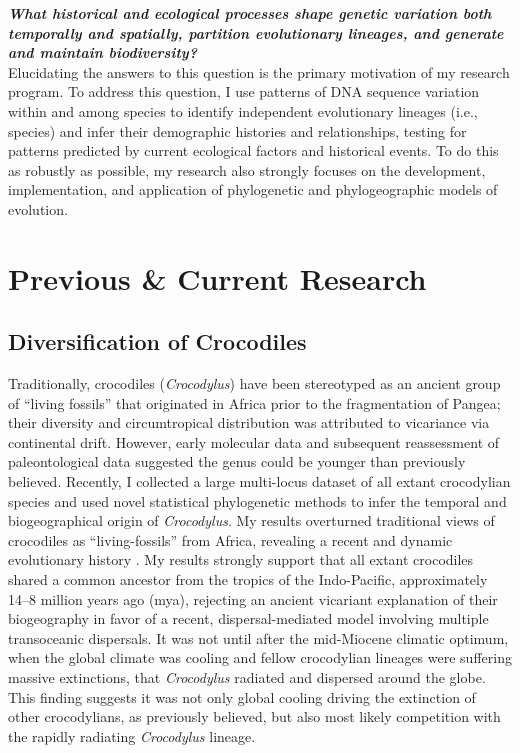 \documentclass[10pt]{article}
\begin{document}
\raggedright
\singlespacing

\textbf{\textit{What historical and ecological processes shape genetic variation both temporally and spatially, partition evolutionary lineages, and generate and maintain biodiversity?}} \\
Elucidating the answers to this question is the primary motivation of my research program.
To address this question, I use patterns of DNA sequence variation within and among species to identify independent evolutionary lineages (i.e., species) and infer their demographic histories and relationships, testing for patterns predicted by current ecological factors and historical events.
To do this as robustly as possible, my research also strongly focuses on the development, implementation, and application of phylogenetic and phylogeographic models of evolution.

\section*{Previous \& Current Research}
\subsection*{Diversification of Crocodiles}
Traditionally, crocodiles (\emph{Crocodylus}) have been stereotyped as an ancient group of ``living fossils'' that originated in Africa prior to the fragmentation of Pangea; their diversity and circumtropical distribution was attributed to vicariance via continental drift.
However, early molecular data and subsequent reassessment of paleontological data suggested the genus could be younger than previously believed.
Recently, I collected a large multi-locus dataset of all extant crocodylian species and used novel statistical phylogenetic methods to infer the temporal and biogeographical origin of \emph{Crocodylus}.
My results overturned traditional views of crocodiles as ``living-fossils'' from Africa, revealing a recent and dynamic evolutionary history .
My results strongly support that all extant crocodiles shared a common ancestor from the tropics of the Indo-Pacific, approximately 14--8 million years ago (mya), rejecting an ancient vicariant explanation of their biogeography in favor of a recent, dispersal-mediated model involving multiple transoceanic dispersals.
It was not until after the mid-Miocene climatic optimum, when the global climate was cooling and fellow crocodylian lineages were suffering massive extinctions, that \emph{Crocodylus} radiated and dispersed around the globe.
This finding suggests it was not only global cooling driving the extinction of other crocodylians, as previously believed, but also most likely competition with the rapidly radiating \emph{Crocodylus} lineage.
\end{document}
